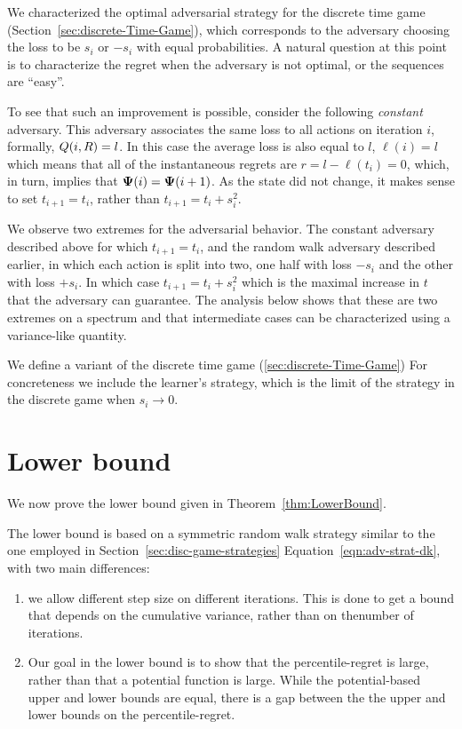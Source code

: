 \documentclass{article}[12pt]
\begin{document}
We characterized the optimal adversarial strategy for the discrete
time game (Section~\ref{sec:discrete-Time-Game}), which corresponds
to the adversary choosing the loss to be $s_i$ or $-s_i$ with equal
probabilities. A natural question at this point is to characterize the
regret when the adversary is not optimal, or the sequences are ``easy''.

To see that such an improvement is possible, consider the following
{\em constant} adversary. This adversary associates the same loss to
all actions on iteration $i$, formally, $Q(i,R) = l$. In this
case the average loss is also equal to $l$, $\ell(i)=l$ which means
that all of the instantaneous regrets are $r=l-\ell(t_i) = 0$, which,
in turn, implies that ${\bf \Psi}(i) = {\bf \Psi}(i+1)$. As the state did not
change, it makes sense to set $t_{i+1}=t_i$, rather than
$t_{i+1}=t_i+s_i^2$.

We observe two extremes for the adversarial behavior. The constant
adversary described above for which $t_{i+1} = t_i$, and the random walk adversary described
earlier, in which each action is split into two, one half with loss
$-s_i$ and the other with loss $+s_i$. In which case $t_{i+1} =
t_i+s_i^2$ which is the maximal increase in $t$ that the adversary can
guarantee. The analysis below shows that these are two extremes on a
spectrum and that intermediate cases can be characterized using a
variance-like quantity.

We define a variant of the discrete time game
(\ref{sec:discrete-Time-Game}) For concreteness we include the
learner's strategy, which is the limit of the strategy in the discrete
game when $s_i \to 0$.


\section{Lower bound} \label{sec:lowerbound}

We now prove the lower bound given in Theorem~\ref{thm:LowerBound}.

The lower bound is based on a symmetric random walk strategy similar
to the one employed in Section~\ref{sec:disc-game-strategies}
Equation~\ref{eqn:adv-strat-dk}, with two main differences:
\begin{enumerate}
\item we allow different step size on different iterations. This is
  done to get a bound that depends on the cumulative variance, rather
  than on thenumber of iterations.
\item Our goal in the lower bound is to show that the
  percentile-regret is large, rather than that a potential function is
  large. While the potential-based upper and lower bounds are equal,
  there is a gap between the the upper and lower bounds on the
  percentile-regret.
\end{enumerate}
\end{document}
